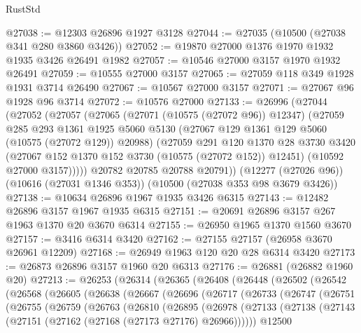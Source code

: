 \begin{lexlean}{RustStd}
\begin{coremodule}
@27038 := @12303 @26896 @1927 @3128
@27044 := @27035 (@10500 (@27038 @341 @280 @3860 @3426))
@27052 := @19870 @27000 @1376 @1970 @1932 @1935 @3426 @26491 @1982
@27057 := @10546 @27000 @3157 @1970 @1932 @26491
@27059 := @10555 @27000 @3157
@27065 := @27059 @118 @349 @1928 @1931 @3714 @26490
@27067 := @10567 @27000 @3157
@27071 := @27067 @96 @1928 @96 @3714
@27072 := @10576 @27000
@27133 := @26996
    (@27044
      (@27052
        (@27057
          (@27065
            (@27071 (@10575 (@27072 @96)) @12347)
            (@27059
              @285
              @293
              @1361
              @1925
              @5060
              @5130
              (@27067 @129 @1361 @129 @5060 (@10575 (@27072 @129)) @20988)
              (@27059
                @291
                @120
                @1370
                @28
                @3730
                @3420
                (@27067 @152 @1370 @152 @3730 (@10575 (@27072 @152)) @12451)
                (@10592 @27000 @3157)))))
        @20782
        @20785
        @20788
        @20791))
    (@12277 (@27026 @96))
    (@10616 (@27031 @1346 @353))
    (@10500 (@27038 @353 @98 @3679 @3426))
@27138 := @10634 @26896 @1967 @1935 @3426 @6315
@27143 := @12482 @26896 @3157 @1967 @1935 @6315
@27151 := @20691 @26896 @3157 @267 @1963 @1370 @20 @3670 @6314
@27155 := @26950 @1965 @1370 @1560 @3670
@27157 := @3416 @6314 @3420
@27162 := @27155 @27157 (@26958 @3670 @26961 @12209)
@27168 := @26949 @1963 @120 @20 @28 @6314 @3420
@27173 := @26873 @26896 @3157 @1960 @20 @6313
@27176 := @26881 (@26882 @1960 @20)
@27213 := @26253
    (@26314
      (@26365
        (@26408
          (@26448
            (@26502
              (@26542
                (@26568
                  (@26605
                    (@26638
                      (@26667
                        (@26696
                          (@26717
                            (@26733
                              (@26747
                                (@26751
                                  (@26755
                                    (@26759
                                      (@26763
                                        (@26810
                                          (@26895
                                            (@26978
                                              (@27133
                                                (@27138
                                                  (@27143
                                                    (@27151
                                                      (@27162 (@27168 (@27173 @27176) @26966))))))
                                              @12500

\end{coremodule}
\end{lexlean}
